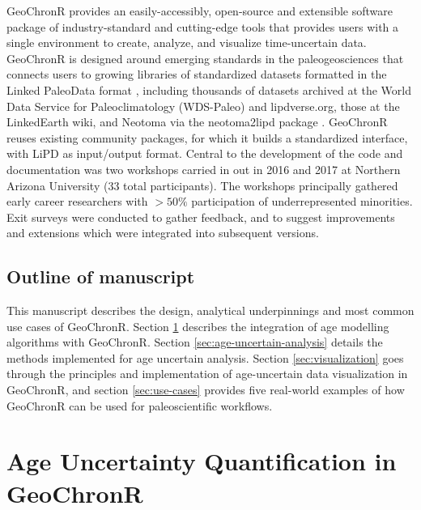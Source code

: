 \documentclass[gchron, manuscript]{copernicus}
\begin{document}
GeoChronR provides an easily-accessibly, open-source and extensible software package of industry-standard and cutting-edge tools that provides users with a single environment to create, analyze, and visualize time-uncertain data.
GeoChronR is designed around emerging standards in the paleogeosciences that connects users to growing libraries of standardized datasets formatted in the Linked PaleoData format \citep{lipd_cp}, including thousands of datasets archived at the World Data Service for Paleoclimatology (WDS-Paleo) and lipdverse.org, those at the LinkedEarth wiki, and Neotoma \citep{williams2018neotoma} via the neotoma2lipd package \citep{neotoma2lipd}.
GeoChronR reuses existing community packages, for which it builds a standardized interface, with LiPD as input/output format.
Central to the development of the code and documentation was two workshops carried in out in 2016 and 2017 at Northern Arizona University (33 total participants).
The workshops principally gathered early career researchers with \(>50\%\) participation of underrepresented minorities.
Exit surveys were conducted to gather feedback, and to suggest improvements and extensions which were integrated into subsequent versions.

\subsection{Outline of manuscript}

This manuscript describes the design, analytical underpinnings and most common use cases of GeoChronR.
Section \ref{sec:age-modeling} describes the integration of age modelling algorithms with GeoChronR.
Section \ref{sec:age-uncertain-analysis} details the methods implemented for age uncertain analysis.
Section \ref{sec:visualization} goes through the principles and implementation of age-uncertain data visualization in GeoChronR, and section \ref{sec:use-cases} provides five real-world examples of how GeoChronR can be used for paleoscientific workflows.

\hypertarget{sec:age-modeling}{%
\section{Age Uncertainty Quantification in GeoChronR}\label{sec:age-modeling}}
\end{document}
